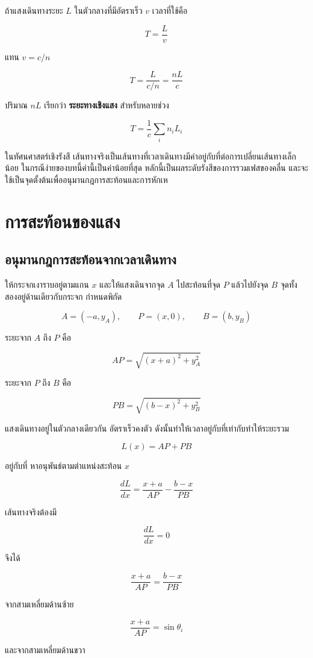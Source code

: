 ถ้าแสงเดินทางระยะ $L$ ในตัวกลางที่มีอัตราเร็ว $v$ เวลาที่ใช้คือ

\[
T=\frac{L}{v}
\]

แทน $v=c/n$

\[
T=\frac{L}{c/n}=\frac{nL}{c}
\]

ปริมาณ $nL$ เรียกว่า \textbf{ระยะทางเชิงแสง} สำหรับหลายช่วง

\[
T=\frac{1}{c}\sum_i n_iL_i
\]

ในทัศนศาสตร์เชิงรังสี เส้นทางจริงเป็นเส้นทางที่เวลาเดินทางมีค่าอยู่กับที่ต่อการเปลี่ยนเส้นทางเล็กน้อย ในกรณีง่ายของบทนี้ค่านี้เป็นค่าน้อยที่สุด หลักนี้เป็นผลระดับรังสีของการรวมเฟสของคลื่น และจะใช้เป็นจุดตั้งต้นเพื่ออนุมานกฎการสะท้อนและการหักเห

\section{การสะท้อนของแสง}

\subsection{อนุมานกฎการสะท้อนจากเวลาเดินทาง}

ให้กระจกเงาราบอยู่ตามแกน $x$ และให้แสงเดินจากจุด $A$ ไปสะท้อนที่จุด $P$ แล้วไปยังจุด $B$ จุดทั้งสองอยู่ด้านเดียวกับกระจก กำหนดพิกัด

\[
A=(-a,y_A),\qquad P=(x,0),\qquad B=(b,y_B)
\]

ระยะจาก $A$ ถึง $P$ คือ

\[
AP=\sqrt{(x+a)^2+y_A^2}
\]

ระยะจาก $P$ ถึง $B$ คือ

\[
PB=\sqrt{(b-x)^2+y_B^2}
\]

แสงเดินทางอยู่ในตัวกลางเดียวกัน อัตราเร็วคงตัว ดังนั้นทำให้เวลาอยู่กับที่เท่ากับทำให้ระยะรวม

\[
L(x)=AP+PB
\]

อยู่กับที่ หาอนุพันธ์ตามตำแหน่งสะท้อน $x$

\[
\frac{dL}{dx}
=
\frac{x+a}{AP}
-
\frac{b-x}{PB}
\]

เส้นทางจริงต้องมี

\[
\frac{dL}{dx}=0
\]

จึงได้

\[
\frac{x+a}{AP}
=
\frac{b-x}{PB}
\]

จากสามเหลี่ยมด้านซ้าย

\[
\frac{x+a}{AP}=\sin\theta_i
\]

และจากสามเหลี่ยมด้านขวา


